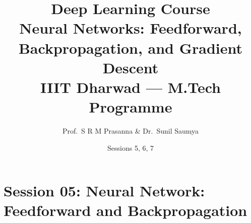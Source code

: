 \documentclass[12pt,a4paper]{article}
\title{%
  {\Large\bfseries Deep Learning Course}\\[6pt]
  {\LARGE Neural Networks: Feedforward, Backpropagation, and Gradient Descent}\\[4pt]
  {\normalsize IIIT Dharwad --- M.Tech Programme}
}
\author{Prof.\ S R M Prasanna \& Dr.\ Sunil Saumya}
\date{Sessions 5, 6, 7}
\begin{document}
\maketitle
\tableofcontents
\clearpage

\part{Session 05: Neural Network: Feedforward and Backpropagation}

\end{document}

